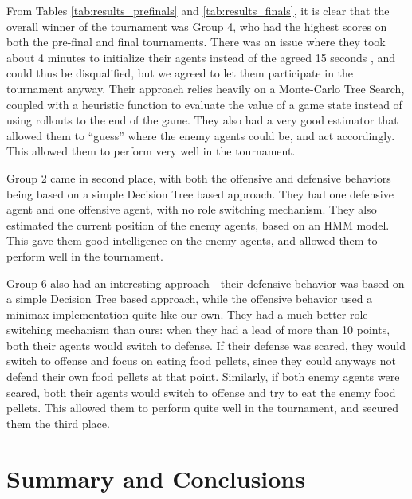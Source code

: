 \documentclass[a4paper,12pt]{article}
\begin{document}
From Tables \ref{tab:results_prefinals} and \ref{tab:results_finals}, it is clear that the overall winner of the tournament was Group 4, who had the highest scores on both the pre-final and final tournaments. 
There was an issue where they took about 4 minutes to initialize their agents instead of the agreed 15 seconds , and could thus be disqualified, but we agreed to let them participate in the tournament anyway. 
Their approach relies heavily on a Monte-Carlo Tree Search, coupled with a heuristic function to evaluate the value of a game state instead of using rollouts to the end of the game. 
They also had a very good estimator that allowed them to ``guess'' where the enemy agents could be, and act accordingly. 
This allowed them to perform very well in the tournament.

Group 2 came in second place, with both the offensive and defensive behaviors being based on a simple Decision Tree based approach. They had one defensive agent and one offensive agent, with no role switching mechanism. They also estimated the current position of the enemy agents, based on an HMM model. This gave them good intelligence on the enemy agents, and allowed them to perform well in the tournament.

Group 6 also had an interesting approach - their defensive behavior was based on a simple Decision Tree based approach, while the offensive behavior used a minimax implementation quite like our own. They had a much better role-switching mechanism than ours: when they had a lead of more than 10 points, both their agents would switch to defense. If their defense was scared, they would switch to offense and focus on eating food pellets, since they could anyways not defend their own food pellets at that point. Similarly, if both enemy agents were scared, both their agents would switch to offense and try to eat the enemy food pellets. This allowed them to perform quite well in the tournament, and secured them the third place.










\section{Summary and Conclusions}
\label{sec:conclusion}
\end{document}
